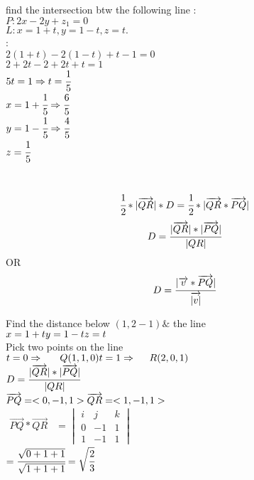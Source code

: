 \begin{example}
 find the intersection btw the following line :\\
$P:2x-2y+z_1 = 0 $\\
$L: x=1+t , y=1-t , z=t .$\\
{{}}:\\ 
 $2(1+t) -2(1-t) +t-1 = 0$\\
$2+2t-2+2t+t=1$\\
$5t = 1\Rightarrow t=\cfrac{1}{5}$\\
$x=1+\cfrac{1}{5} \Rightarrow \cfrac{6}{5}$\\
$y=1-\cfrac{1}{5} \Rightarrow \cfrac{4}{5}$\\
$z=\cfrac{1}{5}$
\end{example}
\noindent{\color{smalt(darkpowderblue)}\rule{\linewidth}{.2mm}}
{}\\
$$\cfrac{1}{2}*|\overrightarrow{QR}|*D=\cfrac{1}{2}*|\overrightarrow{QR}*\overrightarrow{PQ}|$$
$$D=\cfrac{|\overrightarrow{QR}|*|\overrightarrow{PQ}|}{|QR|}$$
OR \\
$$D=\cfrac{|\overrightarrow{v}*\overrightarrow{PQ}|}{\overrightarrow{|v|}}$$
\begin{example}
Find the distance below $(1,2-1) \&$ the line \\ 
$x=1+t \\
y=1-t \\
z=t$\\
{}
Pick two points on the line \\
$t=0 \Rightarrow ~~~~~ Q(1,1,0) \\
t=1 \Rightarrow ~~~~  R(2,0,1)$\\
$D=\cfrac{|\overrightarrow{QR}|*|\overrightarrow{PQ}|}{|QR|}$\\ 
$\overrightarrow{PQ}=<0,-1,1> \\
\overrightarrow{QR} =<1,-1,1>$ \\
$\begin{array}{rcl}
\overrightarrow{PQ}*\overrightarrow{QR} & =
\begin{vmatrix}
 i& j&k  \\
0 &  -1&1  \\
 1&  -1&1 
\end{vmatrix}
\end{array}$\\
$=\cfrac{\sqrt{0+1+1}}{\sqrt{1+1+1}}=\sqrt{\cfrac{2}{3}}$
\end{example}
